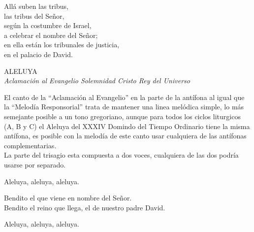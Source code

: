 \documentclass[12pt, letterpaper]{report}
\begin{document}
    \noindent
    All\'a suben las tribus,\\
    las tribus del Se\~nor,\\
    seg\'un la costumbre de Israel,\\
    a celebrar el nombre del Se\~nor;\\
    en ella est\'an los tribunales de justicia,\\
    en el palacio de David.
    \clearpage



    \begin{center}
      {\large ALELUYA}\\
      \textit{Aclamaci\'on al Evangelio Solemnidad Cristo Rey del Universo}
    \end{center}

    El canto de la ``Aclamaci\'on al Evangelio'' en la parte de la ant\'ifona al igual que la ``Melod\'ia Responsorial'' trata de mantener una linea mel\'odica simple, lo m\'as semejante posible a un tono gregoriano, aunque para todos los ciclos liturgicos (A, B y C) el Aleluya del XXXIV Domindo del Tiempo Ordinario tiene la misma ant\'ifona, es posible con la melod\'ia de este canto usar cualquiera de las ant\'ifonas complementarias.\\
    La parte del trisagio esta compuesta a dos voces, cualquiera de las dos podr\'ia usarse por separado.

    \noindent
    Aleluya, aleluya, aleluya.

    \noindent
    Bendito el que viene en nombre del Se\~nor.\\
    Bendito el reino que llega, el de nuestro padre David.

    \noindent
    Aleluya, aleluya, aleluya.
    \clearpage

\end{document}

